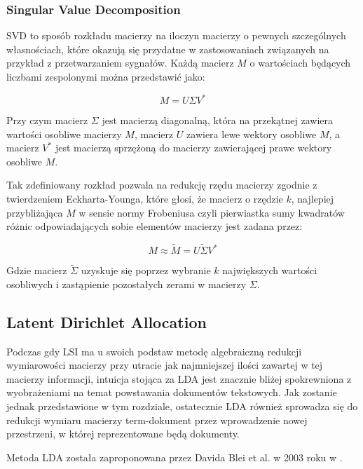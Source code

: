 \documentclass[11pt,a4paper]{article}
\begin{document}
\subsubsection{Singular Value Decomposition}

SVD to sposób rozkładu macierzy na iloczyn macierzy o pewnych szczególnych
własnościach, które okazują się przydatne w zastosowaniach związanych na
przykład z przetwarzaniem sygnałów. Każdą macierz $M$ o wartościach będących
liczbami zespolonymi można przedstawić jako:

\begin{equation}
  \label{svd}
  M = U\Sigma V^*
\end{equation}

\noindent
Przy czym macierz $\Sigma$ jest macierzą diagonalną, która na przekątnej
zawiera wartości osobliwe macierzy $M$, macierz $U$ zawiera lewe wektory
osobliwe $M$, a macierz $V^*$ jest macierzą sprzężoną do macierzy zawierającej
prawe wektory osobliwe $M$.

Tak zdefiniowany rozkład pozwala na redukcję rzędu macierzy zgodnie z
twierdzeniem Eckharta-Younga, które głosi, że macierz o rzędzie $k$, najlepiej
przybliżająca $M$ w sensie normy Frobeniusa czyli pierwiastka sumy kwadratów
różnic odpowiadających sobie elementów macierzy jest zadana przez:

\begin{equation}
  M \approx \tilde{M} = U\tilde{\Sigma} V^*
\end{equation}

\noindent
Gdzie macierz $\tilde{\Sigma}$ uzyskuje się poprzez wybranie $k$ największych
wartości osobliwych i zastąpienie pozostałych zerami w macierzy $\Sigma$.

\subsection{Latent Dirichlet Allocation}
\label{sec:lda}

Podczas gdy LSI ma u swoich podstaw metodę algebraiczną redukcji wymiarowości
macierzy przy utracie jak najmniejszej ilości zawartej w tej macierzy
informacji, intuicja stojąca za LDA jest znacznie bliżej spokrewniona z
wyobrażeniami na temat powstawania dokumentów tekstowych. Jak zostanie jednak
przedstawione w tym rozdziale, ostatecznie LDA również sprowadza się do redukcji
wymiaru macierzy term-dokument przez wprowadzenie nowej przestrzeni, w której
reprezentowane będą dokumenty.

Metoda LDA została zaproponowana przez Davida Blei et al. w 2003 roku w
\cite{lda-paper}.
\end{document}
